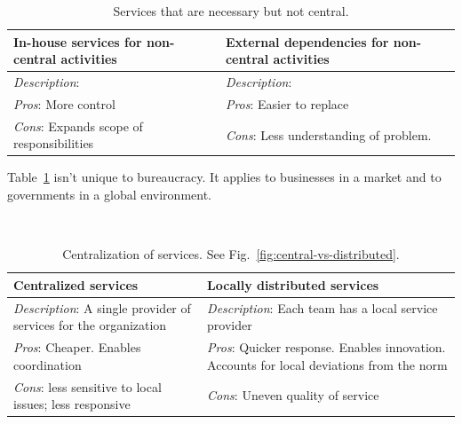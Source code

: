 \begin{center}
\begin{table}[ht]
\begin{tabular}{ | m{\dilemmatablewidth}| m{\dilemmatablewidth} | } 
  \hline
  \textbf{In-house services for non-central activities } &
  \textbf{External dependencies for non-central activities} \\
  \hline
  \textit{Description}:  &
  \textit{Description}:  \\  
  \hline
  \textit{Pros}: More control &
  \textit{Pros}: Easier to replace \\
  \hline
  \textit{Cons}: Expands scope of responsibilities & 
  \textit{Cons}: Less understanding of problem.  \\
  \hline
\end{tabular}
\caption{Services that are necessary but not central.
}
\label{table:inhouse-vs-external}
\end{table}
\end{center}

Table~\ref{table:inhouse-vs-external} isn't unique to bureaucracy. It applies to businesses in a market and to governments in a global environment. 

\ \\

\begin{center}
\begin{table}[ht]
\begin{tabular}{ | m{\dilemmatablewidth}| m{\dilemmatablewidth} | } 
  \hline
  \textbf{Centralized services} &
  \textbf{Locally distributed services} \\
  \hline
  \textit{Description}: A single provider of services for the organization &
  \textit{Description}: Each team has a local service provider \\  
  \hline
  \textit{Pros}: Cheaper. Enables coordination &
  \textit{Pros}: Quicker response. 
  Enables innovation. 
  Accounts for local deviations from the norm \\
  \hline
  \textit{Cons}: less sensitive to local issues; less responsive & 
  \textit{Cons}: Uneven quality of service \\
  \hline
\end{tabular}
\caption{Centralization of services. 
See Fig.~\ref{fig:central-vs-distributed}.
}
\label{table:central-vs-distributed}
\end{table}
\end{center}

